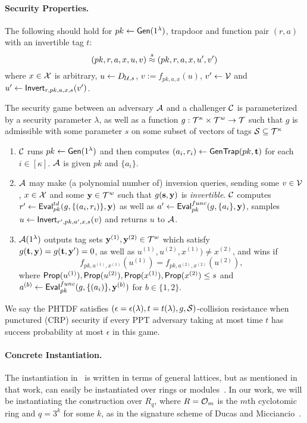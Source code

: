 \paragraph{Security Properties.} 

The following should hold for $pk \gets \mathsf{Gen}(1^\lambda)$,
trapdoor and function pair $(r,a)$ with an invertible tag $t$:
\[(pk,r,a,x,u,v) \stackrel{s}{\approx} (pk,r,a,x,u',v')\] where $x \in \mathcal{X}$ is arbitrary, $u \gets
D_{\mathcal{U},s}$, $v := f_{pk,a,x}(u)$, $v' \gets \mathcal{V}$ and $u' \gets
\mathsf{Invert}_{r,pk,a,x,s}(v')$.


The security game between an adversary $\mathcal{A}$ and a challenger $\mathcal{C}$
is parameterized by a security parameter $\lambda$, as well as a
function $g: \mathcal{T}^{\kappa} \times \mathcal{T}^{w} \to \mathcal{T}$ such that $g$
is admissible with some parameter $s$ on some subset of vectors of tags
$\mathcal{S} \subseteq \mathcal{T}^{\kappa}$
\begin{enumerate}[itemsep=1pt]

\item $\mathcal{C}$ runs $pk \gets \mathsf{Gen}(1^{\lambda})$ and then
  computes $(a_i, r_i) \gets \mathsf{GenTrap}(pk,\mathbf{t})$ for each $i \in
  [\kappa]$.  $\mathcal{A}$ is given $pk$ and $\{a_i\}$.
\item $\mathcal{A}$ may make (a polynomial number of) inversion queries, sending some $v \in
  \mathcal{V}$, $x \in \mathcal{X}$ and some $\mathbf{y} \in \mathcal{T}^{w}$ such that
  $g(\mathbf{s},\mathbf{y})$ is \emph{invertible}. $\mathcal{C}$ computes
  $r' \gets \mathsf{Eval}_{pk}^{td}(g,\{(a_i,r_i)\},\mathbf{y})$ as well as $a' \gets
  \mathsf{Eval}_{pk}^{func}(g,\{a_i\},\mathbf{y})$, samples $u \gets \mathsf{Invert}_{r',pk,a',x,s}(v)$ and returns
$u$ to $\mathcal{A}$. 
\item $\mathcal{A}(1^\lambda)$ outputs tag sets $\mathbf{y}^{(1)}, \mathbf{y}^{(2)} \in \mathcal{T}^{w}$ which satisfy\\
  $g(\mathbf{t},\mathbf{y})=g(\mathbf{t},\mathbf{y}')=0$, as well as
  $u^{(1)},u^{(2)}, x^{(1)}) \neq x^{(2)}$, and wins if
  \[f_{pk,a^{(1)},x^{(1)}}(u^{(1)})=f_{pk,a^{(2)},x^{(2)}}(u^{(2)}),\] where
  $\mathsf{Prop}(u^{(1)}),\mathsf{Prop}(u^{(2)}), \mathsf{Prop}(x^{(1)}),\mathsf{Prop}(x^{(2)})  \leq s$ and $a^{(b)} \gets
  \mathsf{Eval}_{pk}^{func}(g,\{(a_i)\}, \mathbf{y}^{(b)})$ for $b \in \{1,2\}$.
\end{enumerate}

We say the PHTDF satisfies
$(\epsilon=\epsilon(\lambda),t=t(\lambda),g,\mathcal{S})$-collision
resistance when punctured (CRP) security if every PPT adversary taking
at most time $t$ has success probability at most $\epsilon$ in this
game.

\paragraph{Concrete Instantiation.}
\label{ref:concrete_inst}
The instantiation in~\cite{DBLP:conf/pkc/Alperin-Sheriff15} is written
in terms of general lattices, but as mentioned in that work, can
easily be instantiated over rings or
modules~\cite{DBLP:journals/dcc/LangloisS15}. 
In our work, we will be instantiating the construction over $R_q$,
where $R=\mathcal{O}_{m}$ is the $m$th cyclotomic ring and $q=3^{k}$ for
some $k$, as in the signature scheme of Ducas and
Micciancio~\cite{DBLP:conf/crypto/DucasM14}. 

